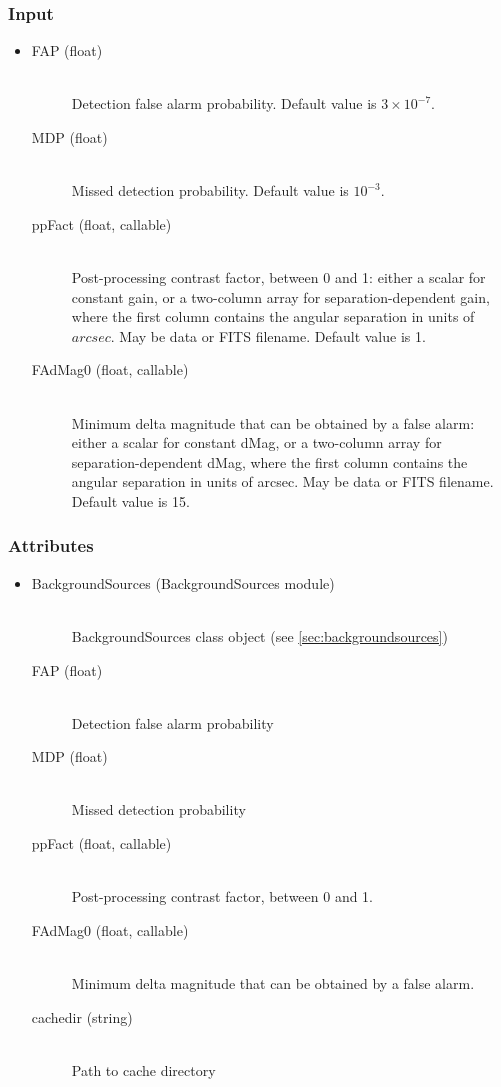 \documentclass[cleanfoot]{asme2ej}
\begin{document}
\subsubsection*{Input}
\begin{itemize}
\item 
\begin{description}
    \item[FAP (float)] \hfill \\ Detection false alarm probability. Default value is $3 \times 10^{-7}$.
    \item[MDP (float)] \hfill \\ Missed detection probability. Default value is $10^{-3}$.
    \item[ppFact (float, callable)] \hfill \\ Post-processing contrast factor, between 0 and 1: either a scalar for constant gain, or a two-column array for separation-dependent gain, where the first column contains the angular separation in units of $arcsec$. May be data or FITS filename. Default value is 1.
    \item[FAdMag0 (float, callable)] \hfill \\ Minimum delta magnitude that can be obtained by a false alarm: either a scalar for constant dMag, or a two-column array for separation-dependent dMag, where the first column contains the angular separation in units of arcsec. May be data or FITS filename. Default value is 15.
\end{description}
\end{itemize}

\subsubsection*{Attributes}
\begin{itemize}
\item 
\begin{description}
    \item[BackgroundSources (BackgroundSources module)] \hfill \\
        BackgroundSources class object (see \ref{sec:backgroundsources})
    \item[FAP (float)] \hfill \\ Detection false alarm probability
    \item[MDP (float)] \hfill \\ Missed detection probability
    \item[ppFact (float, callable)] \hfill \\ Post-processing contrast factor, between 0 and 1.
    \item[FAdMag0 (float, callable)] \hfill \\ Minimum delta magnitude that can be obtained by a false alarm.
    \item[cachedir (string)] \hfill \\ Path to cache directory
\end{description}
\end{itemize}
\end{document}
